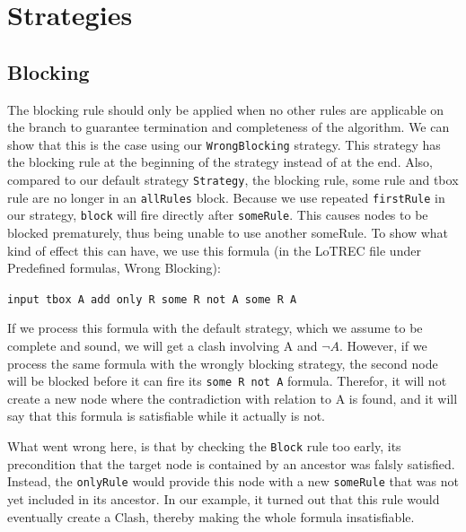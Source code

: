\documentclass[11pt]{article} %
\begin{document}
\section{Strategies}
\label{sec:strategies}

\subsection{Blocking}

The blocking rule should only be applied when no other rules are applicable on the branch to guarantee termination and completeness of the algorithm. We can show that this is the case using our \texttt{WrongBlocking} strategy. This strategy has the blocking rule at the beginning of the strategy instead of at the end. Also, compared to our default strategy \texttt{Strategy}, the blocking rule, some rule and tbox rule are no longer in an \texttt{allRules} block. Because we use repeated \texttt{firstRule} in our strategy, \texttt{block} will fire directly after \texttt{someRule}. This causes nodes to be blocked prematurely, thus being unable to use another someRule. To show what kind of effect this can have, we use this formula (in the LoTREC file under Predefined formulas, Wrong Blocking):

\begin{center}
\texttt{input tbox A add only R some R not A some R A}
\end{center}

If we process this formula with the default strategy, which we assume to be complete and sound, we will get a clash involving A and $\neg A$. However, if we process the same formula with the wrongly blocking strategy, the second node will be blocked before it can fire its \texttt{some R not A} formula. Therefor, it will not create a new node where the contradiction with relation to A is found, and it will say that this formula is satisfiable while it actually is not.

What went wrong here, is that by checking the \texttt{Block} rule too early, its precondition that the target node is contained by an ancestor was falsly satisfied. Instead, the \texttt{onlyRule} would provide this node with a new \texttt{someRule} that was not yet included in its ancestor. In our example, it turned out that this rule would eventually create a Clash, thereby making the whole formula insatisfiable.
 
\end{document}
